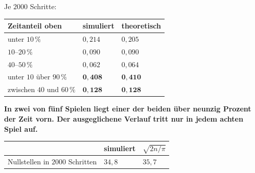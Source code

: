 \begin{merksatz}
Je $2000$ Schritte:

\begin{center}
{\small
\renewcommand{\arraystretch}{1.46}
\begin{tabular}{@{}P{2.6cm}P{2.2cm}P{2.4cm}@{}}
\toprule
\textbf{Zeitanteil oben} & \textbf{simuliert} & \textbf{theoretisch}\\
\midrule
unter $10\,\%$ & $0{,}214$ & $0{,}205$\\
$10$--$20\,\%$ & $0{,}090$ & $0{,}090$\\
$40$--$50\,\%$ & $0{,}062$ & $0{,}064$\\
\midrule
unter $10$  über $90\,\%$ & $\mathbf{0{,}408}$ & $\mathbf{0{,}410}$\\
zwischen $40$ und $60\,\%$ & $\mathbf{0{,}128}$ & $\mathbf{0{,}128}$\\
\bottomrule
\end{tabular}}
\end{center}

\begin{center}
\begin{minipage}{0.9\textwidth}
\textbf{In zwei von fünf Spielen liegt einer der beiden über neunzig Prozent der Zeit vorn. Der ausgeglichene Verlauf tritt nur in jedem achten Spiel auf.}
\end{minipage}
\end{center}

\begin{center}
\begin{minipage}{0.88\textwidth}
\end{minipage}
\end{center}

\begin{center}
{\small
\renewcommand{\arraystretch}{1.46}
\begin{tabular}{@{}P{3.2cm}P{2.0cm}P{2.2cm}@{}}
\toprule
& \textbf{simuliert} & $\sqrt{2n/\pi}$\\
\midrule
Nullstellen in $2000$ Schritten & $34{,}8$ & $35{,}7$\\
\bottomrule
\end{tabular}}
\end{center}

\end{merksatz}

